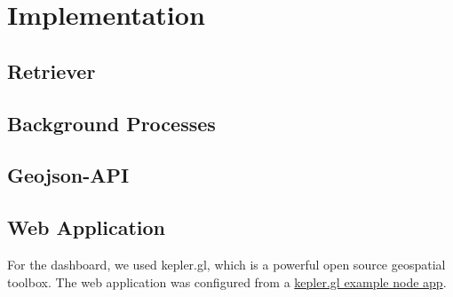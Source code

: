 \section{Implementation}
\subsection{Retriever}

\subsection{Background Processes}
\cite{jenkins}

\subsection{Geojson-API}

\subsection{Web Application}
For the dashboard, we used kepler.gl, which is a powerful open source geospatial toolbox. 
\cite{kepler}
The web application was configured from a \href{https://github.com/keplergl/kepler.gl/tree/master/examples/node-app}{kepler.gl example node app}.
